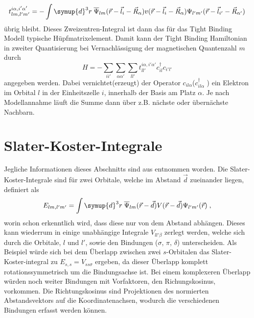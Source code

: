 \begin{equation*} 
    t^{i\alpha,i'\alpha'}_{lm,l'm'} = - \int \symup{d}^3r \; \overline{\Psi}_{lm}(\vec{r}-\vec{l}_i - \vec{R}_{\alpha}) 
    v(\vec{r} - \vec{l}_{i} - \vec{R}_{\alpha} ) \Psi_{l'm'}(\vec{r}-\vec{l}_{i'} - \vec{R}_{\alpha'}) 
\end{equation*}
übrig bleibt.\cite{SC_literature}
Dieses Zweizentren-Integral ist dann das für das Tight Binding Modell typische Hüpfmatrixelement.
Damit kann der Tight Binding Hamiltonian in zweiter Quantisierung bei Vernachlässigung der 
magnetischen Quantenzahl $m$ durch
\begin{equation}
    H = - \sum_{ii'} \sum_{\alpha \alpha'}\sum_{ll'} t^{i\alpha,i'\alpha'}_{ll'}  c_{il}^\dagger c_{i'l'}  \label{eqn:tight-binding-hamiltonian}
\end{equation}
angegeben werden.\cite{anders-fkt}
Dabei vernichtet(erzeugt) der Operator $c_{il\alpha}$($c_{il\alpha}^{\dagger}$ ) ein Elektron im Orbital $l$ in der Einheitszelle $i$,
innerhalb der Basis am Platz $\alpha$.
Je nach Modellannahme läuft die Summe dann über z.B. nächste oder übernächste Nachbarn.
\section{Slater-Koster-Integrale}
Jegliche Informationen dieses Abschnitts sind aus \cite{SC_literature} entnommen worden.
Die Slater-Koster-Integrale sind für zwei Orbitale, welche im Abstand $\vec{d}$ zueinander liegen, definiert als
\begin{equation}
    E_{lm,l'm'} = \int \symup{d}^3r \; \overline{\Psi}_{lm} (\vec{r}-\vec{d})
    V(\vec{r} - \vec{d}) \Psi_{l'm'} (\vec{r}) \; ,
\end{equation}
worin schon erkenntlich wird, dass diese nur von dem Abstand abhängen.
Dieses kann wiederrum in einige unabhängige Integrale $V_{ll'\beta}$ zerlegt werden, welche sich durch die Orbitale, $l$ und $l'$, sowie den Bindungen ($\sigma$, $\pi$, $\delta$) unterscheiden.
Als Beispiel würde sich bei dem Überlapp zwischen zwei $s$-Orbitalen das Slater-Koster-integral zu $E_{s,s} = V_{ss\sigma}$ ergeben, da dieser Überlapp komplett rotationssymmetrisch um die 
Bindungsachse ist.
Bei einem komplexeren Überlapp würden noch weiter Bindungen mit Vorfaktoren, den Richungskosinus, vorkommen.
Die Richtungskosinus sind Projektionen des normierten Abstandsvektors auf die Koordinatenachsen, wodurch die verschiedenen Bindungen erfasst werden können.